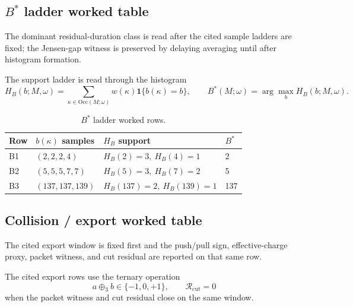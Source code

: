 \subsection{\texorpdfstring{$B^*$}{B*} ladder worked table}
\label{man:bstar-ladder-worked-table}
The dominant residual-duration class is read after the cited sample ladders are fixed; the Jensen-gap witness is preserved by delaying averaging until after histogram formation.\par\smallskip
{}

The support ladder is read through the histogram
\[
H_B(b;M,\omega)=\sum_{\kappa\in\mathrm{Occ}(M;\omega)}w(\kappa)\mathbf 1\{b(\kappa)=b\},
\qquad
B^*(M;\omega)=\arg\max_b H_B(b;M,\omega).
\]

\begin{table}[H]
\centering
\caption{$B^*$ ladder worked rows.}
\label{tab:manual-bstar-ladder}
\begin{threeparttable}
\small
\begin{tabular}{@{}llll@{}}
\toprule
Row & $b(\kappa)$ samples & $H_B$ support & $B^*$ \\
\midrule
B1 & $(2,2,2,4)$ & $H_B(2)=3,\ H_B(4)=1$ & 2 \\
B2 & $(5,5,5,7,7)$ & $H_B(5)=3,\ H_B(7)=2$ & 5 \\
B3 & $(137,137,139)$ & $H_B(137)=2,\ H_B(139)=1$ & 137 \\
\bottomrule
\end{tabular}
\end{threeparttable}
\end{table}

\subsection{Collision / export worked table}
\label{man:collision-export-worked-table}
The cited export window is fixed first and the push/pull sign, effective-charge proxy, packet witness, and cut residual are reported on that same row.\par\smallskip
{}

The cited export rows use the ternary operation
\[
a\oplus_3 b\in\{-1,0,+1\},
\qquad
\mathcal R_{\mathrm{cut}}=0
\]
when the packet witness and cut residual close on the same window.

